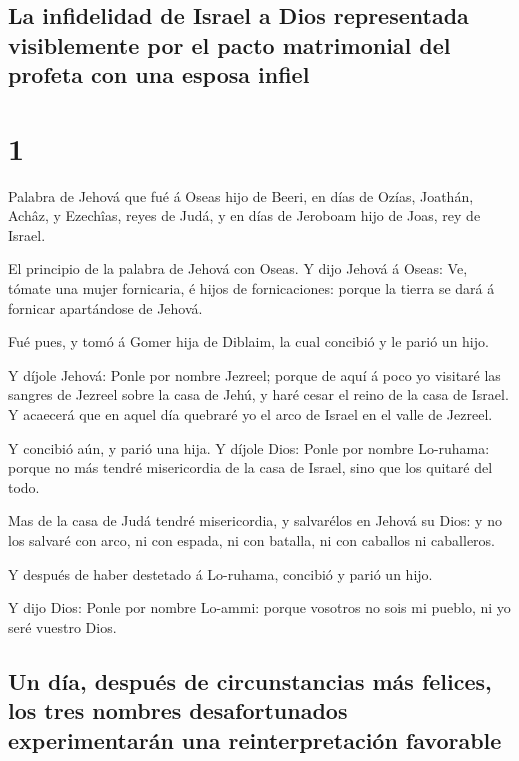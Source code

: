 \hypertarget{la-infidelidad-de-israel-a-dios-representada-visiblemente-por-el-pacto-matrimonial-del-profeta-con-una-esposa-infiel}{%
\subsection{La infidelidad de Israel a Dios representada visiblemente
por el pacto matrimonial del profeta con una esposa
infiel}\label{la-infidelidad-de-israel-a-dios-representada-visiblemente-por-el-pacto-matrimonial-del-profeta-con-una-esposa-infiel}}

\hypertarget{section-28-1}{%
\section{1}\label{section-28-1}}

 Palabra de Jehová que fué á Oseas hijo de Beeri, en días
de Ozías, Joathán, Achâz, y Ezechîas, reyes de Judá, y en días de
Jeroboam hijo de Joas, rey de Israel.

 El principio de la palabra de Jehová con Oseas. Y dijo
Jehová á Oseas: Ve, tómate una mujer fornicaria, é hijos de
fornicaciones: porque la tierra se dará á fornicar apartándose de
Jehová.

 Fué pues, y tomó á Gomer hija de Diblaim, la cual
concibió y le parió un hijo.

 Y díjole Jehová: Ponle por nombre Jezreel; porque de aquí
á poco yo visitaré las sangres de Jezreel sobre la casa de Jehú, y haré
cesar el reino de la casa de Israel.  Y acaecerá que en
aquel día quebraré yo el arco de Israel en el valle de Jezreel.

 Y concibió aún, y parió una hija. Y díjole Dios: Ponle
por nombre Lo-ruhama: porque no más tendré misericordia de la casa de
Israel, sino que los quitaré del todo.

 Mas de la casa de Judá tendré misericordia, y salvarélos
en Jehová su Dios: y no los salvaré con arco, ni con espada, ni con
batalla, ni con caballos ni caballeros.

 Y después de haber destetado á Lo-ruhama, concibió y
parió un hijo.

 Y dijo Dios: Ponle por nombre Lo-ammi: porque vosotros no
sois mi pueblo, ni yo seré vuestro Dios.

\hypertarget{un-duxeda-despuuxe9s-de-circunstancias-muxe1s-felices-los-tres-nombres-desafortunados-experimentaruxe1n-una-reinterpretaciuxf3n-favorable}{%
\subsection{Un día, después de circunstancias más felices, los tres
nombres desafortunados experimentarán una reinterpretación
favorable}\label{un-duxeda-despuuxe9s-de-circunstancias-muxe1s-felices-los-tres-nombres-desafortunados-experimentaruxe1n-una-reinterpretaciuxf3n-favorable}}

